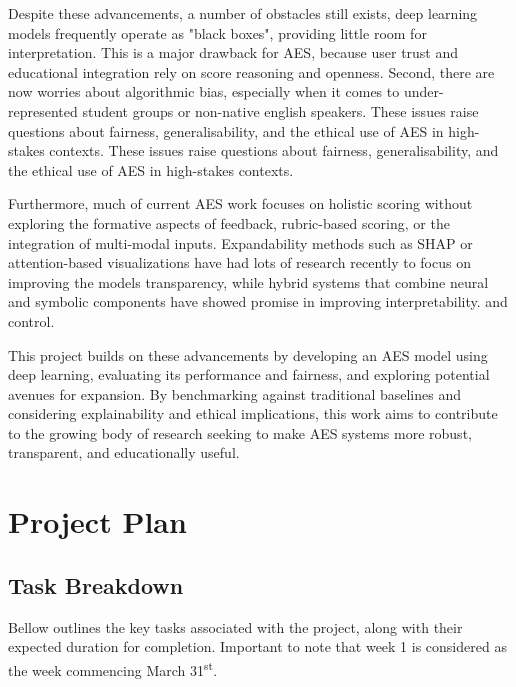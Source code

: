 \documentclass[11pt]{article}
\begin{document}
Despite these advancements, a number of obstacles still exists, deep learning models frequently operate as "black boxes", providing little room 
for interpretation. This is a major drawback for AES, because user trust and educational integration rely on score reasoning and openness.
Second, there are now worries about algorithmic bias, especially when it comes to under-represented student groups or non-native english speakers.
These issues raise questions about fairness, generalisability, and the ethical use of AES in high-stakes contexts. These issues raise questions about 
fairness, generalisability, and the ethical use of AES in high-stakes contexts.

Furthermore, much of current AES work focuses on holistic scoring without exploring the formative aspects of feedback, rubric-based scoring, or the 
integration of multi-modal inputs. Expandability methods such as SHAP or attention-based visualizations have had lots of research recently to focus
on improving the models transparency, while hybrid systems that combine neural and symbolic components have showed promise in improving interpretability.
and control.

This project builds on these advancements by developing an AES model using deep learning, evaluating its performance and fairness, and exploring potential 
avenues for expansion. By benchmarking against traditional baselines and considering explainability and ethical implications, this work aims to contribute  
to the growing body of research seeking to make AES systems more robust, transparent, and educationally useful.

\section*{Project Plan}
\subsection*{Task Breakdown}
Bellow outlines the key tasks associated with the project, along with their expected duration for completion. Important to note that week 1 is considered 
as the week commencing March 31\textsuperscript{st}.
\end{document}
